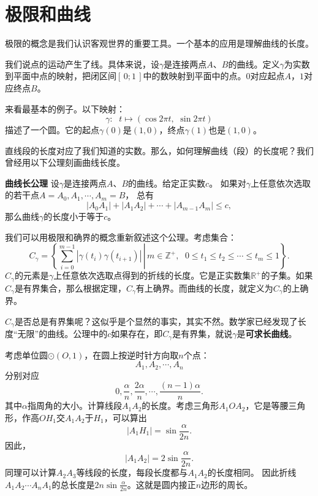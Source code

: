 \documentclass[12pt,UTF8,fontset=none]{ctexbook}
\begin{document}
\section{极限和曲线}

极限的概念是我们认识客观世界的重要工具。一个基本的应用是理解曲线的长度。

我们说点的运动产生了线。具体来说，设$\gamma$是连接两点$A$、$B$的曲线。定义$\gamma$为实数到平面中点的映射，把闭区间$[\,0;1\,]$中的数映射到平面中的点。$0$对应起点$A$，$1$对应终点$B$。

来看最基本的例子。以下映射：
$$ \gamma : \;\,\, t \mapsto (\cos{2\pi t}, \,\, \sin{2\pi t})$$
描述了一个圆。它的起点$\gamma(0)$是$(1,0)$，终点$\gamma(1)$也是$(1,0)$。

直线段的长度对应了我们知道的实数。那么，如何理解曲线（段）的长度呢？我们曾经用以下公理刻画曲线长度。
\begin{po}{\textbf{曲线长公理}}
    设$\gamma$是连接两点$A$、$B$的曲线。给定正实数$c$。
    如果对$\gamma$上任意依次选取的若干点$A = A_0, A_1, \cdots , A_m = B$，
    总有
    $$ |A_0A_1| + |A_1A_2| + \cdots + |A_{m-1}A_m| \leqslant c,$$
    那么曲线$\gamma$的长度小于等于$c$。
\end{po}

我们可以用极限和确界的概念重新叙述这个公理。考虑集合：
$$ C_\gamma = \left\{\left. \sum_{i=0}^{m-1} |\gamma(t_i)\gamma(t_{i+1})|\, \right| \, m\in\mathbb{Z}^+,\;\,\, 0\leqslant t_1 \leqslant t_2 \leqslant \cdots \leqslant t_m\leqslant 1 \right\}.$$
$C_\gamma$的元素是$\gamma$上任意依次选取点得到的折线的长度。它是正实数集$\mathbb{R}^+$的子集。如果$C_\gamma$是有界集合，那么根据定理\label{tm:2-2-10}，$C_\gamma$有上确界。而曲线的长度，就定义为$C_\gamma$的上确界。

$C_\gamma$是否总是有界集呢？这似乎是个显然的事实，其实不然。数学家已经发现了长度“无限”的曲线。公理中的$c$如果存在，即$C_\gamma$是有界集，就说$\gamma$是\textbf{可求长曲线}。

\begin{ex}
    考虑单位圆$\odot(O, 1)$，在圆上按逆时针方向取$n$个点：
    $$ A_1, A_2, \cdots , A_n $$
    分别对应
    $$0,\frac{\alpha}{n}, \frac{2\alpha}{n}, \cdots , \frac{(n-1)\alpha}{n}.$$
    其中$\alpha$指周角的大小。计算线段$A_1A_2$的长度。考虑三角形$A_1OA_2$，它是等腰三角形，作高$OH_1$交$A_1A_2$于$H_1$，可以算出
    $$ |A_1H_1| = \sin{\frac{\alpha}{2n}}.$$
    因此，
    $$ |A_1A_2| = 2\sin{\frac{\alpha}{2n}}.$$
    同理可以计算$A_2A_3$等线段的长度，每段长度都与$A_1A_2$的长度相同。
    因此折线$A_1A_2\cdots A_nA_1$的总长度是$2n\sin{\frac{\alpha}{2n}}$。这就是圆内接正$n$边形的周长。
\end{ex}
\end{document}
